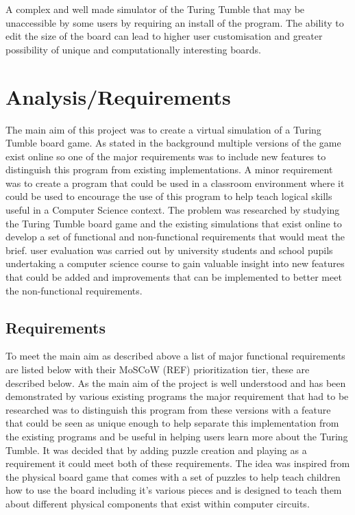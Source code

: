 \documentclass{l4proj}
\begin{document}
A complex and well made simulator of the Turing Tumble that may be unaccessible by some users by requiring an install of the program. The ability to edit the size of the board can lead to higher user customisation and greater possibility of unique and computationally interesting boards. 
\chapter{Analysis/Requirements}




The main aim of this project was to create a virtual simulation of a Turing Tumble board game. As stated in the background multiple versions of the game exist online so one of the major requirements was to include new features to distinguish this program from existing implementations. A minor requirement was to create a program that could be used in a classroom environment where it could be used to encourage the use of this program to help teach logical skills useful in a Computer Science context. The problem was researched by studying the Turing Tumble board game and the existing simulations that exist online to develop a set of functional and non-functional requirements that would meat the brief. user evaluation was carried out by university students and school pupils undertaking a computer science course to gain valuable insight into new features that could be added and improvements that can be implemented to better meet the non-functional requirements.

\section{Requirements}
To meet the main aim as described above a list of major functional requirements are listed below with their MoSCoW (REF) prioritization tier, these are described below. As the main aim of the project is well understood and has been demonstrated by various existing programs the major requirement that had to be researched was to distinguish this program from these versions with a feature that could be seen as unique enough to help separate this implementation from the existing programs and be useful in helping users learn more about the Turing Tumble. It was decided that by adding puzzle creation and playing as a requirement it could meet both of these requirements. The idea was inspired from the physical board game that comes with a set of puzzles to help teach children how to use the board including it's various pieces and is designed to teach them about different physical components that exist within computer circuits. 
\end{document}
